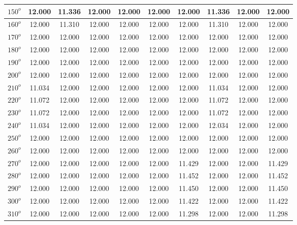 \begin{table}[H]
\begin{tabular}{|c|c|c|c|c|c|c|c|c|c|}
	         \hline
	         $150^{o}$ & 12.000 & 11.336 & 12.000 & 12.000 & 12.000 & 12.000 & 11.336 & 12.000 & 12.000\\
	         \hline
	         $160^{o}$ & 12.000 & 11.310 & 12.000 & 12.000 & 12.000 & 12.000 & 11.310 & 12.000 & 12.000  \\
	         \hline
	         $170^{o}$ & 12.000 & 12.000 & 12.000 & 12.000 & 12.000 & 12.000 & 12.000& 12.000 & 12.000  \\
	         \hline
	         $180^{o}$ & 12.000 & 12.000 & 12.000 & 12.000 & 12.000 & 12.000 & 12.000& 12.000 & 12.000  \\
	         \hline
	         $190^{o}$ & 12.000 & 12.000 & 12.000 & 12.000 & 12.000 & 12.000 & 12.000& 12.000 & 12.000  \\
	         \hline
	         $200^{o}$ & 12.000 & 12.000 & 12.000 & 12.000 & 12.000 & 12.000 & 12.000& 12.000 & 12.000  \\
	         \hline
	         $210^{o}$ & 11.034 & 12.000 & 12.000 & 12.000 & 12.000 & 12.000 & 11.034 & 12.000 & 12.000  \\
	         \hline
	         $220^{o}$ & 11.072 & 12.000 & 12.000 & 12.000 & 12.000 & 12.000 & 11.072 & 12.000 & 12.000  \\
	         \hline
	         $230^{o}$ & 11.072 & 12.000 & 12.000 & 12.000 & 12.000 & 12.000 & 11.072 & 12.000 & 12.000  \\
	         \hline
	         $240^{o}$ & 11.034 & 12.000 & 12.000 & 12.000 & 12.000 & 12.000 & 12.034 & 12.000 & 12.000  \\
	         \hline
	         $250^{o}$ & 12.000 & 12.000 & 12.000 & 12.000 & 12.000 & 12.000 & 12.000& 12.000 & 12.000  \\
	         \hline
	         $260^{o}$ & 12.000 & 12.000 & 12.000 & 12.000 & 12.000 & 12.000 & 12.000& 12.000 & 12.000  \\
	         \hline
	         $270^{o}$ & 12.000 & 12.000 & 12.000 & 12.000 & 12.000 & 11.429 & 12.000& 12.000 & 11.429  \\
	         \hline
	         $280^{o}$ & 12.000 & 12.000 & 12.000 & 12.000 & 12.000 & 11.452 & 12.000& 12.000 & 11.452  \\
	         \hline
	         $290^{o}$ & 12.000 & 12.000 & 12.000 & 12.000 & 12.000 & 11.450 & 12.000& 12.000 & 11.450  \\
	         \hline
	         $300^{o}$ & 12.000 & 12.000 & 12.000 & 12.000 & 12.000 & 11.422 & 12.000& 12.000 & 11.422  \\
	         \hline
	         $310^{o}$ & 12.000 & 12.000 & 12.000 & 12.000 & 12.000 & 11.298 & 12.000& 12.000 & 11.298  \\

\end{tabular}
\end{table}
